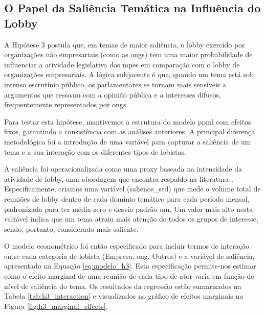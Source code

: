 \subsection{O Papel da Saliência Temática na Influência do Lobby}

A Hipótese 3 postula que, em temas de maior saliência, o lobby exercido por organizações não empresariais (como as \acrshort{ong}s) tem uma maior probabilidade de influenciar a atividade legislativa dos \acrshort{mpe}s em comparação com o lobby de organizações empresariais. A lógica subjacente é que, quando um tema está sob intenso escrutínio público, os parlamentares se tornam mais sensíveis a argumentos que ressoam com a opinião pública e a interesses difusos, frequentemente representados por \acrshort{ong}s.

Para testar esta hipótese, mantivemos a estrutura do modelo \acrshort{ppml} com efeitos fixos, garantindo a consistência com as análises anteriores. A principal diferença metodológica foi a introdução de uma variável para capturar a saliência de um tema e a sua interação com os diferentes tipos de lobistas.

A saliência foi operacionalizada como uma proxy baseada na intensidade da atividade de lobby, uma abordagem que encontra respaldo na literatura \cite{baumgartner2010agendas}. Especificamente, criamos uma variável (salience\_std) que mede o volume total de reuniões de lobby dentro de cada domínio temático para cada período mensal, padronizada para ter média zero e desvio padrão um. Um valor mais alto nesta variável indica que um tema atraiu mais atenção de todos os grupos de interesse, sendo, portanto, considerado mais saliente.

O modelo econométrico foi então especificado para incluir termos de interação entre cada categoria de lobista (Empresa, \acrshort{ong}, Outros) e a variável de saliência, apresentado na Equação \ref{eq:modelo_h3}. Esta especificação permite-nos estimar como o efeito marginal de uma reunião de cada tipo de ator varia em função do nível de saliência do tema. Os resultados da regressão estão sumarizados na Tabela \ref{tab:h3_interaction} e visualizados no gráfico de efeitos marginais na Figura \ref{fig:h3_marginal_effects}.




